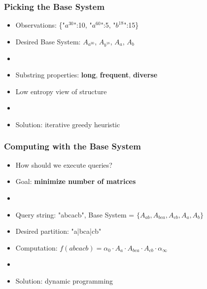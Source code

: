 \documentclass{beamer}
\begin{document}
\begin{frame}
\frametitle{Picking the Base System}
\begin{itemize}


\item Observations: \{"$a^{30}$":10, "$a^{60}$":5, "$b^{18}$":15\}

\item[] Desired Base System: $A_{a^{30}}$, $A_{b^{18}}$, $A_a$, $A_b$
\item[]

\item Substring properties: 
\textbf{long}, \textbf{frequent}, \textbf{diverse}
\item[] Low entropy view of structure
\item[]

\item Solution: iterative greedy heuristic 



\end{itemize}
\end{frame}


\begin{frame}
\frametitle{Computing with the Base System}
\begin{itemize}


\item How should we execute queries?
\item[] Goal: \textbf{minimize number of matrices}
\item[]

\item[] Query string: "abcacb", Base System = $\{A_{ab}, A_{bca}, A_{cb}, A_a, A_b \}$ 


\item[] Desired partition: "a|bca|cb"
\item[] Computation: $f(abcacb)=\alpha_0 \cdot A_a \cdot A_{bca} \cdot A_{cb} \cdot \alpha_\infty$ 
\item[]

\item Solution: dynamic programming


\end{itemize}
\end{frame}

\end{document}

